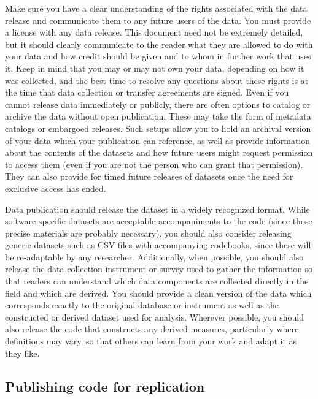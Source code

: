 Make sure you have a clear understanding of the rights associated with the data release
and communicate them to any future users of the data.
You must provide a license with any data release.
This document need not be extremely detailed,
but it should clearly communicate to the reader what they are allowed to do with your data and
how credit should be given and to whom in further work that uses it.
Keep in mind that you may or may not own your data,
depending on how it was collected,
and the best time to resolve any questions about these rights
is at the time that data collection or transfer agreements are signed.
Even if you cannot release data immediately or publicly,
there are often options to catalog or archive the data without open publication.
These may take the form of metadata catalogs or embargoed releases.
Such setups allow you to hold an archival version of your data
which your publication can reference,
as well as provide information about the contents of the datasets
and how future users might request permission to access them
(even if you are not the person who can grant that permission).
They can also provide for timed future releases of datasets
once the need for exclusive access has ended.

Data publication should release the dataset in a widely recognized format.
While software-specific datasets are acceptable accompaniments to the code
(since those precise materials are probably necessary),
you should also consider releasing generic datasets
such as CSV files with accompanying codebooks,
since these will be re-adaptable by any researcher.
Additionally, when possible, you should also release
the data collection instrument or survey used to gather the information
so that readers can understand which data components are
collected directly in the field and which are derived.
You should provide a clean version of the data
which corresponds exactly to the original database or instrument
as well as the constructed or derived dataset used for analysis.
Wherever possible, you should also release the code
that constructs any derived measures,
particularly where definitions may vary,
so that others can learn from your work and adapt it as they like.

\subsection{Publishing code for replication}

